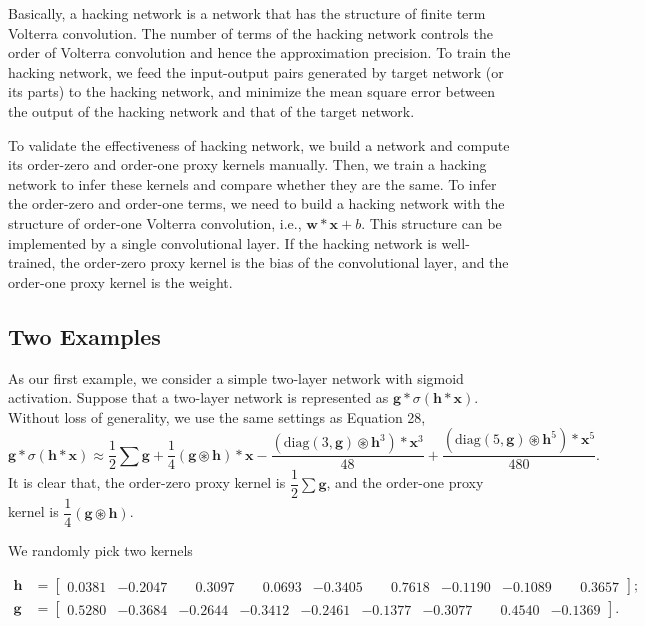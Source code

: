 \documentclass[twoside,11pt]{article}
\newcommand{\syncrecord}[2]{#2} %
\def\oconv{\circledast}
\def\diag{\text{diag}}
\def\tvar#1{\mathbf{#1}} %
\begin{document}
Basically, a hacking network is a network that has the structure of finite term Volterra convolution.
The number of terms of the hacking network controls the order of Volterra convolution and hence the approximation precision.
To train the hacking network, we feed the input-output pairs generated by target network (or its parts) to the hacking network, and minimize the mean square error between the output of the hacking network and that of the target network.


To validate the effectiveness of hacking network, we build a network and compute its order-zero and order-one proxy kernels manually. Then, we train a hacking network to infer these kernels and compare whether they are the same.
To infer the order-zero and order-one terms, we need to build a hacking network with the structure of order-one Volterra convolution, i.e., \(\tvar{w} * \tvar{x} + b\).
This structure can be implemented by a single convolutional layer.
If the hacking network is well-trained, the order-zero proxy kernel is the bias of the convolutional layer, and the order-one proxy kernel is the weight.

\subsection{Two Examples}
\label{subsec:two-examples}

As our first example, we consider a simple two-layer network with sigmoid activation. Suppose that a two-layer network is represented as \(\tvar{g} * \sigma(\tvar{h} * \tvar{x})\).
Without loss of generality, we use the same settings as Equation 28, %
\begin{equation*}
  \tvar{g} * \sigma(\tvar{h} * \tvar{x})
  \approx \dfrac{1}{2} \sum \tvar{g}
  + \dfrac{1}{4} (\tvar{g} \oconv \tvar{h}) * \tvar{x}
  - \dfrac{(\diag(3, \tvar{g}) \oconv \tvar{h}^3) * \tvar{x}^3}{48}
  + \dfrac{(\diag(5, \tvar{g}) \oconv \tvar{h}^5) * \tvar{x}^5}{480}.
\end{equation*}
It is clear that, the order-zero proxy kernel is \(\dfrac{1}{2} \sum \tvar{g}\), and the order-one proxy kernel is \(\dfrac{1}{4} (\tvar{g} \oconv \tvar{h})\).

We randomly pick two kernels
\begin{small}
  \syncrecord{oconv_l2_kernels}{
    \begin{equation*}
      \begin{aligned}
        \tvar{h} & = \begin{bmatrix}0.0381&-0.2047&\phantom{-}0.3097&\phantom{-}0.0693&-0.3405&\phantom{-}0.7618&-0.1190&-0.1089&\phantom{-}0.3657\end{bmatrix}; \\
        \tvar{g} & = \begin{bmatrix}0.5280&-0.3684&-0.2644&-0.3412&-0.2461&-0.1377&-0.3077&\phantom{-}0.4540&-0.1369\end{bmatrix}. \\
      \end{aligned}
    \end{equation*}
  }
\end{small}
\end{document}
